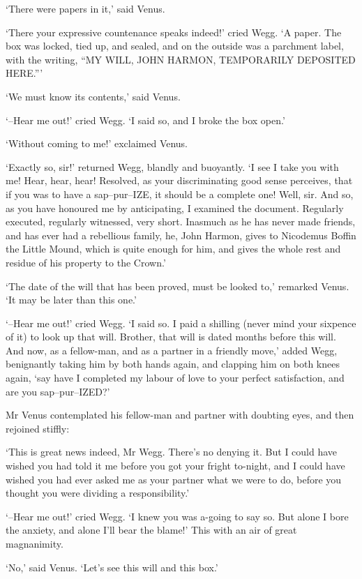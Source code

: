 ‘There were papers in it,’ said Venus.

‘There your expressive countenance speaks indeed!’ cried Wegg. ‘A
paper. The box was locked, tied up, and sealed, and on the outside was
a parchment label, with the writing, “MY WILL, JOHN HARMON, TEMPORARILY
DEPOSITED HERE.”’

‘We must know its contents,’ said Venus.

‘--Hear me out!’ cried Wegg. ‘I said so, and I broke the box open.’

‘Without coming to me!’ exclaimed Venus.

‘Exactly so, sir!’ returned Wegg, blandly and buoyantly. ‘I see I take
you with me! Hear, hear, hear! Resolved, as your discriminating good
sense perceives, that if you was to have a sap--pur--IZE, it should be
a complete one! Well, sir. And so, as you have honoured me by
anticipating, I examined the document. Regularly executed, regularly
witnessed, very short. Inasmuch as he has never made friends, and has
ever had a rebellious family, he, John Harmon, gives to Nicodemus Boffin
the Little Mound, which is quite enough for him, and gives the whole
rest and residue of his property to the Crown.’

‘The date of the will that has been proved, must be looked to,’ remarked
Venus. ‘It may be later than this one.’

‘--Hear me out!’ cried Wegg. ‘I said so. I paid a shilling (never mind
your sixpence of it) to look up that will. Brother, that will is dated
months before this will. And now, as a fellow-man, and as a partner in a
friendly move,’ added Wegg, benignantly taking him by both hands again,
and clapping him on both knees again, ‘say have I completed my labour of
love to your perfect satisfaction, and are you sap--pur--IZED?’

Mr Venus contemplated his fellow-man and partner with doubting eyes, and
then rejoined stiffly:

‘This is great news indeed, Mr Wegg. There’s no denying it. But I could
have wished you had told it me before you got your fright to-night, and
I could have wished you had ever asked me as your partner what we were
to do, before you thought you were dividing a responsibility.’

‘--Hear me out!’ cried Wegg. ‘I knew you was a-going to say so. But
alone I bore the anxiety, and alone I’ll bear the blame!’ This with an
air of great magnanimity.

‘No,’ said Venus. ‘Let’s see this will and this box.’

